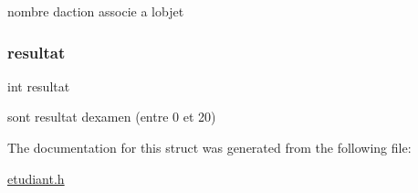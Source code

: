 nombre d\textquotesingle{}action associe a l\textquotesingle{}objet \mbox{\label{structetudiant_a8afc85cb27005e2bd7dfc73222b85a46}} 
\subsubsection{\texorpdfstring{resultat}{resultat}}
{\footnotesize\ttfamily int resultat}

sont resultat d\textquotesingle{}examen (entre 0 et 20) 

The documentation for this struct was generated from the following file\+:\begin{DoxyCompactItemize}
\item 
\mbox{\hyperlink{etudiant_8h}{etudiant.\+h}}\end{DoxyCompactItemize}
